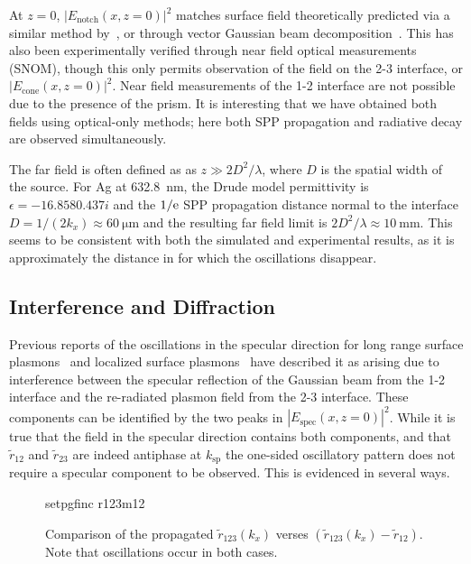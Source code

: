 At $z=0$, $|E_\text{notch}(x,z=0)|^2$ matches surface field theoretically
predicted via a similar method by~\cite{chuang1986lateral}, or through
vector Gaussian beam decomposition~\cite{baida1999theoretical}.  This has
also been experimentally verified through near field optical measurements
(SNOM), though this only permits observation of the field on the 2-3
interface, or $|E_\text{cone}(x,z=0)|^2$.  Near field measurements of the
1-2 interface are not possible due to the presence of the prism.  It is
interesting that we have obtained both fields using optical-only methods;
here both SPP propagation and radiative decay are observed simultaneously.

The far field is often defined as as $z\gg 2 D^2/\lambda$, where $D$ is the
spatial width of the source.  For Ag at \SI{632.8}{\nano\meter}, the Drude
model permittivity is $\epsilon = \num{-16.858+0.437i}$ and the
$1/{\mathrm{e}}$ SPP propagation distance normal to the interface $D = 1/(2 k_x)
\approx \SI{60}{\micro\meter}$ and the resulting far field limit is $2
D^2/\lambda \approx \SI{10}{\milli\meter}$.  This seems to be consistent
with both the simulated and experimental results, as it is approximately
the distance in  for which the oscillations
disappear.

\subsection{Interference and Diffraction}
Previous reports of the oscillations in the specular direction for long
range surface plasmons~\cite{simon2007observation} and localized surface
plasmons~\cite{schumann2008near} have described it as arising due to
interference between the specular reflection of the Gaussian beam from the
1-2 interface and the re-radiated plasmon field from the 2-3 interface.
These components can be identified by the two peaks in
$|E_\text{spec}(x,z=0)|^2$.  While it is true that the field in the
specular direction contains both components, and that $\tilde{r}_{12}$ and
$\tilde{r}_{23}$ are indeed antiphase at $k_\text{sp}$ the one-sided
oscillatory pattern does not require a specular component to be observed.
This is evidenced in several ways.
\begin{figure}[ht]
 \centering
 {setpgfinc}
 {r123m12}
\caption{Comparison of the propagated $\tilde{r}_{123}(k_x)$ verses
$(\tilde{r}_{123}(k_x)-\tilde{r}_{12})$.  Note that oscillations occur in
both cases.  }
 \label{fig:r123m12}
\end{figure}

